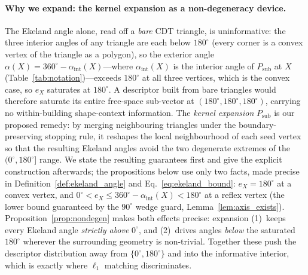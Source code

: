 \documentclass[10pt]{article}
\theoremstyle{plain}
\theoremstyle{definition}
\begin{document}
\paragraph{Why we expand: the kernel expansion as a non-degeneracy device.}
The Ekeland angle alone, read off a \emph{bare} CDT triangle, is uninformative:
the three interior angles of any triangle are each below $180^\circ$ (every
corner is a convex vertex of the triangle as a polygon), so the exterior angle
$\alpha(X)=360^\circ-\alpha_{\mathrm{int}}(X)$---where $\alpha_{\mathrm{int}}(X)$
is the interior angle of $P_{\mathrm{sub}}$ at $X$ (Table~\ref{tab:notation})---exceeds $180^\circ$ at all three
vertices, which is the convex case, so $e_X$ saturates at $180^\circ$.
A descriptor built from bare triangles would therefore saturate its entire
free-space sub-vector at $(180^\circ,180^\circ,180^\circ)$, carrying no
within-building shape-context information.
The \emph{kernel expansion} $P_{\mathrm{sub}}$ is our proposed remedy: by
merging neighbouring triangles under the boundary-preserving stopping rule, it
reshapes the local neighbourhood of each seed vertex so that the resulting
Ekeland angles avoid the two degenerate extremes of the $(0^\circ,180^\circ]$
range.
We state the resulting guarantees first and give the explicit construction
afterwards; the propositions below use only two facts, made precise in
Definition~\ref{def:ekeland_angle} and Eq.~\eqref{eq:ekeland_bound}: $e_X=180^\circ$
at a convex vertex, and $0^\circ<e_X\le360^\circ-\alpha_{\mathrm{int}}(X)<180^\circ$
at a reflex vertex (the lower bound guaranteed by the $90^\circ$ wedge guard,
Lemma~\ref{lem:axis_exists}).
Proposition~\ref{prop:nondegen} makes both effects precise: expansion (1)~keeps
every Ekeland angle \emph{strictly above} $0^\circ$, and (2)~drives angles
\emph{below} the saturated $180^\circ$ wherever the surrounding geometry is
non-trivial.
Together these push the descriptor distribution away from $\{0^\circ,180^\circ\}$
and into the informative interior, which is exactly where $\ell_1$ matching
discriminates.
\end{document}
